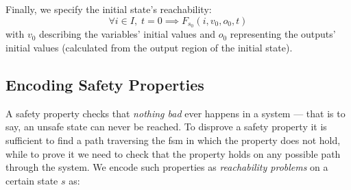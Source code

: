 \documentclass[acmsmall,screen,review]{acmart}
\begin{document}
Finally, we specify the initial state's reachability:
\begin{equation}
  \forall i\in I,\; t = 0 \implies F_{s_0}(i, v_{0}, o_0, t)
  \label{eq:safety-prop}
\end{equation}
with $v_{0}$ describing the variables' initial values and $o_0$ representing 
the outputs' initial values (calculated from the output region of the initial state).


\subsection{Encoding Safety Properties}

A safety property checks that \textit{nothing bad} ever happens in a system --- that is to say, an unsafe state can never be reached.
To disprove a safety property it is sufficient to find a path traversing the \ac{fsm} in which the property does not hold, while to prove it we need to check that the property holds on any possible path through the system.
We encode such properties as \textit{reachability problems} on a certain state $s$ as:



\end{document}
